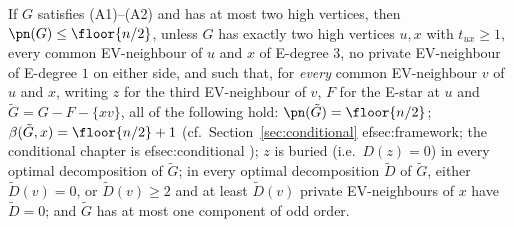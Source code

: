 \begin{corollary}\label{cor:twohigh}
If $G$ satisfies {\rm(A1)}--{\rm(A2)} and has at most two high vertices, then
$\pn(G)\le\floor{n/2}$, unless $G$ has exactly two high vertices $u,x$ with $t_{ux}\ge1$,
every common EV-neighbour of $u$ and $x$ of E-degree $3$, no private EV-neighbour of E-degree
$1$ on either side, and such that, for \emph{every} common EV-neighbour $v$ of $u$ and $x$,
writing $z$ for the third EV-neighbour of $v$, $F$ for the E-star at $u$ and
$\tilde G=G-F-\{xv\}$, all of the following hold:
$\pn(\tilde G)=\floor{n/2}$; $\beta(\tilde G,x)=\floor{n/2}+1$ (cf.\
Section~\ref{sec:conditional}%
ef{sec:framework}; the conditional chapter is 
ef{sec:conditional}
); $z$ is buried (i.e.\ $D(z)=0$) in every optimal decomposition of
$\tilde G$; in every optimal decomposition $\tilde D$ of $\tilde G$, either $\tilde D(v)=0$,
or $\tilde D(v)\ge2$ and at least $\tilde D(v)$ private EV-neighbours of $x$ have
$\tilde D=0$; and $\tilde G$ has at most one component of odd order.
\end{corollary}
